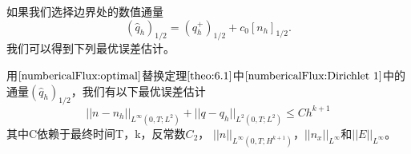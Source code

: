 \documentclass[lang=cn,newtx,10pt,scheme=chinese]{elegantbook}
\begin{document}
\begin{remark}
    如果我们选择边界处的数值通量
    \begin{equation}
        (\hat{q}_h)_{1/2} = (q_h^+)_{1/2} + c_0[n_h]_{1/2}. \label{numbericalFlux:optimal}
    \end{equation}
    我们可以得到下列最优误差估计。
\end{remark}
\begin{theorem}
    用$\ref{numbericalFlux:optimal}$替换定理$\ref{theo:6.1}$中$\ref{numbericalFlux:Dirichlet 1}$中的通量$(\hat{q}_h)_{1/2}$，我们有以下最优误差估计
    \begin{equation}
        ||n-n_h||_{L^{\infty}(0,T;L^2)} + ||q - q_h||_{L^2(0,T;L^2)} \leq C h^{k+1}
    \end{equation}
    其中C依赖于最终时间T，k，反常数$C_2$， $||n||_{L^{\infty}(0,T;H^{k+1})}$，$||n_x||_{L^{\infty}}$和$||E||_{L^{\infty}}$。
\end{theorem}
\end{document}
